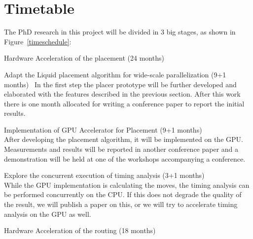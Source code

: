 \documentclass[a4paper,oneside,12pt]{article}
\begin{document}

\section{Timetable}\label{timetable}

The PhD research in this project will be divided in 3 big stages, as shown in Figure~\ref{timeschedule}:

\begin{description*}
\item[Hardware Acceleration of the placement (24 months)]\ %

\begin{description*}
\item[Adapt the {\sc Liquid} placement algorithm for wide-scale parallelization (9+1 months)]\
In the first step the placer prototype will be further developed and elaborated with the features described in the previous section. After this work there is one month allocated for writing a conference paper to report the initial results.
\item[Implementation of GPU Accelerator for Placement (9+1 months)]\
\\After developing the placement algorithm, it will be implemented on the GPU. Measurements and results will be reported in another conference paper and a demonstration will be held at one of the workshops accompanying a conference.
\item[Explore the concurrent execution of timing analysis (3+1 months)]\
\\While the GPU implementation is calculating the moves, the timing analysis can be performed concurrently on the CPU. If this does not degrade the quality of the result, we will publish a paper on this, or we will try to accelerate timing analysis on the GPU as well.
\end{description*}

\item[Hardware Acceleration of the routing (18 months)]\


\end{description*}
\end{document}
